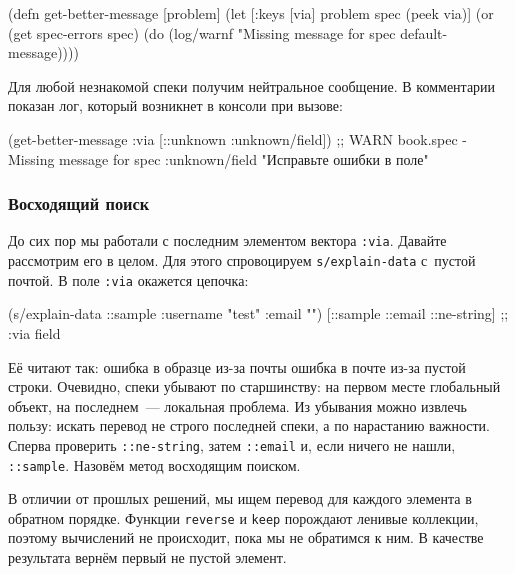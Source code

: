 \begin{english}
  \begin{clojure}
(defn get-better-message [problem]
  (let [{:keys [via]} problem
        spec (peek via)]
    (or (get spec-errors spec)
        (do (log/warnf "Missing message for spec %
            default-message))))
  \end{clojure}
\end{english}

\noindent
Для любой незнакомой спеки получим нейтральное сообщение. В комментарии показан
лог, который возникнет в консоли при вызове:

  \begin{clojure}
(get-better-message {:via [::unknown :unknown/field]})
;; WARN book.spec - Missing message for spec :unknown/field
"Исправьте ошибки в поле"
  \end{clojure}

\subsubsection{Восходящий поиск}

До сих пор мы работали с последним элементом вектора \verb|:via|. Давайте
рассмотрим его в целом. Для этого спровоцируем \verb|s/explain-data| с~пустой
почтой. В поле \verb|:via| окажется цепочка:

\begin{english}
  \begin{clojure}
(s/explain-data ::sample {:username "test" :email ""})
[::sample ::email ::ne-string] ;; :via field
  \end{clojure}
\end{english}

Её читают так: ошибка в образце из-за почты \arr{} ошибка в почте из-за
пустой строки. Очевидно, спеки убывают по старшинству: на первом месте
глобальный объект, на последнем~--- локальная проблема. Из убывания можно
извлечь пользу: искать перевод не строго последней спеки, а по нарастанию
важности. Сперва проверить \verb|::ne-string|, затем \verb|::email| и, если
ничего не нашли, \verb|::sample|. Назовём метод восходящим поиском.


В отличии от прошлых решений, мы ищем перевод для каждого элемента в обратном
порядке. Функции \verb|reverse| и \verb|keep| порождают ленивые коллекции,
поэтому вычислений не происходит, пока мы не обратимся к ним. В качестве
результата вернём первый не пустой элемент.

